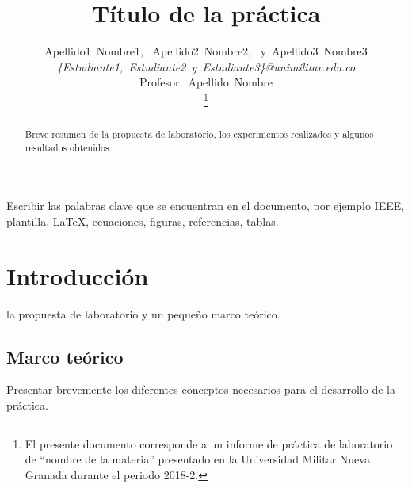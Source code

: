 \documentclass[journal]{IEEEtran}
\begin{document}
\title{Título de la práctica}
\author{Apellido1~Nombre1,~
        Apellido2~Nombre2,~
        y~Apellido3~Nombre3\\
				\textit{\{Estudiante1,~Estudiante2~y~Estudiante3\}@unimilitar.edu.co}\\
				Profesor:~Apellido~Nombre\\%
\thanks{El presente documento corresponde a un informe de práctica de laboratorio de ``nombre de la materia'' presentado en la Universidad Militar Nueva Granada durante el periodo 2018-2.}} %

\maketitle

\begin{abstract}
Breve resumen de la propuesta de laboratorio, los experimentos realizados y algunos resultados obtenidos.
\end{abstract}
\begin{IEEEkeywords}
Escribir las palabras clave que se encuentran en el documento, por ejemplo IEEE, plantilla, \LaTeX, ecuaciones, figuras, referencias, tablas.
\end{IEEEkeywords}
\section{Introducción}
 la propuesta de laboratorio y un pequeño marco teórico.

\subsection{Marco teórico}
Presentar brevemente los diferentes conceptos necesarios para el desarrollo de la práctica. 
\end{document}
